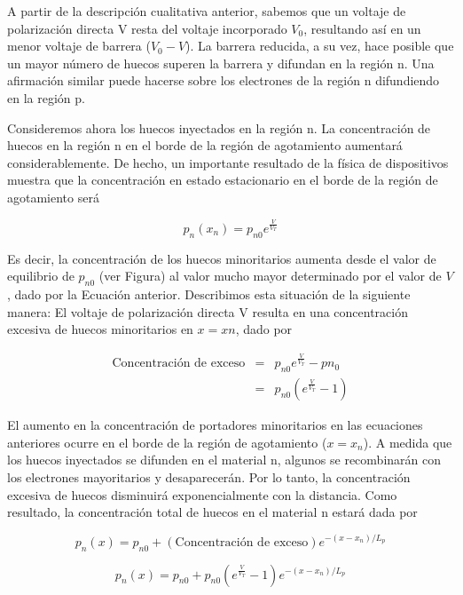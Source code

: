 A partir de la descripción cualitativa anterior, sabemos que un voltaje de polarización directa V resta del voltaje incorporado \(V_0\), resultando así en un menor voltaje de barrera (\(V_0 - V\)). La barrera reducida, a su vez, hace posible que un mayor número de huecos superen la barrera y difundan en la región n. Una afirmación similar puede hacerse sobre los electrones de la región n difundiendo en la región p.

Consideremos ahora los huecos inyectados en la región n. La concentración de huecos en la región n en el borde de la región de agotamiento aumentará considerablemente. De hecho, un importante resultado de la física de dispositivos muestra que la concentración en estado estacionario en el borde de la región de agotamiento será

\begin{equation*}
p_n (x_n) = p_{n0} e^{\frac{V}{V_T}}
\end{equation*}

Es decir, la concentración de los huecos minoritarios aumenta desde el valor de equilibrio de \(p_{n0}\) (ver Figura) al valor mucho mayor determinado por el valor de $V$, dado por la Ecuación anterior.
Describimos esta situación de la siguiente manera: El voltaje de polarización directa V resulta en una concentración excesiva de huecos minoritarios en \(x = xn\), dado por

\begin{eqnarray*}
\text{Concentración de exceso} &=& p_{n0} e ^{\frac{V}{V_T}} - p{n_0} \\
&=& p_{n0} \left( e ^{\frac{V}{V_T}} - 1 \right)
\end{eqnarray*}

El aumento en la concentración de portadores minoritarios en las ecuaciones anteriores ocurre en el borde de la región de agotamiento (\(x = x_n\)). A medida que los huecos inyectados se difunden en el material n, algunos se recombinarán con los electrones mayoritarios y desaparecerán. Por lo tanto, la concentración excesiva de huecos disminuirá exponencialmente con la distancia. Como resultado, la concentración total de huecos en el material n estará dada por

\begin{equation*}
p_{n} (x) = p_{n0} + (\text{Concentración de exceso}) e^{-(x-x_n)/L_p}
\end{equation*}

\begin{equation*}
p_{n} (x) = p_{n0} + p_{n0} \left( e ^{\frac{V}{V_T}} - 1 \right) e^{-(x-x_n)/L_p}
\end{equation*}

